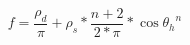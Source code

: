 \begin{equation}
	f = \frac{\rho_{d}}{\pi} + \rho_{s} * \frac{n+2}{2*\pi} * \cos{\theta_{h}}^{n}
\end{equation}